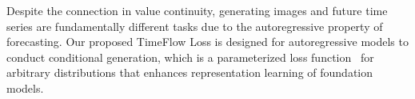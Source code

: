 Despite the connection in value continuity, generating images and future time series are fundamentally different tasks due to the autoregressive property of forecasting. Our proposed TimeFlow Loss is designed for autoregressive models to conduct conditional generation, which is a parameterized loss function~\cite{zhang2018unreasonable} for arbitrary distributions that enhances representation learning of foundation models.